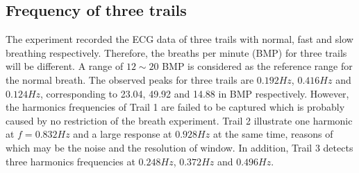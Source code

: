 \subsection{Frequency of three trails}
The experiment recorded the ECG data of three trails with normal, fast and slow breathing respectively. Therefore, the breaths per minute (BMP) for three trails will be different. A range of $12 \sim 20$ BMP is considered as the reference range for the normal breath. The observed peaks for three trails are $0.192Hz$, $0.416Hz$ and $0.124Hz$, corresponding to 23.04, 49.92 and 14.88 in BMP respectively. However, the harmonics frequencies of Trail 1 are failed to be captured which is probably caused by no restriction of the breath experiment. Trail 2 illustrate one harmonic at $f=0.832Hz$ and a large response at $0.928Hz$ at the same time, reasons of which may be the noise and the resolution of window. In addition, Trail 3 detects three harmonics frequencies at $0.248Hz$, $0.372Hz$ and $0.496Hz$.
